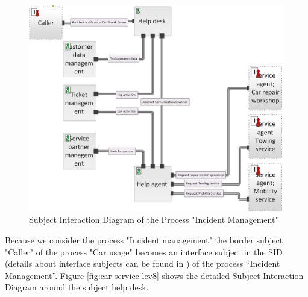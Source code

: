 \begin{figure}[htbp]
	\centering
	\includegraphics[width=1.0\linewidth]{Figures/Chapter5/figures-hierarchy/Car-Service-Lev6}
	\caption[Subject Interaction Diagram of the Process "Incident Management"]{Subject Interaction Diagram of the Process "Incident Management"}
	\label{fig:car-service-lev6}
\end{figure}

Because we consider the process "Incident management" the border subject "Caller" of the process "Car usage" becomes an interface subject in the SID (details about interface subjects can be found in \cite{Flei12}) of the process “Incident Management”. Figure \ref{fig:car-service-lev8} shows the detailed Subject Interaction Diagram around the subject help desk. \\

